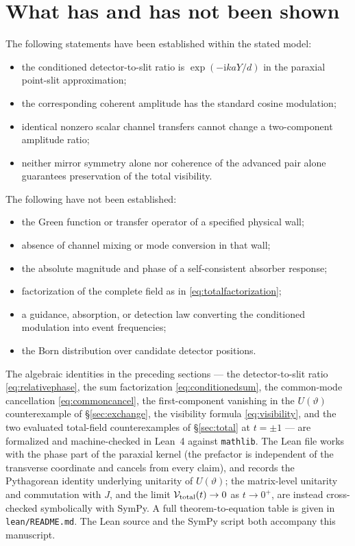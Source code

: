 \documentclass[11pt]{article}
\newcommand{\ii}{\mathrm{i}}
\begin{document}
\section{What has and has not been shown}

The following statements have been established within the stated model:

\begin{itemize}
\item the conditioned detector-to-slit ratio is $\exp(-\ii kaY/d)$ in the paraxial point-slit approximation;
\item the corresponding coherent amplitude has the standard cosine modulation;
\item identical nonzero scalar channel transfers cannot change a two-component amplitude ratio;
\item neither mirror symmetry alone nor coherence of the advanced pair alone guarantees preservation of the total visibility.
\end{itemize}

The following have not been established:

\begin{itemize}
\item the Green function or transfer operator of a specified physical wall;
\item absence of channel mixing or mode conversion in that wall;
\item the absolute magnitude and phase of a self-consistent absorber response;
\item factorization of the complete field as in \eqref{eq:totalfactorization};
\item a guidance, absorption, or detection law converting the conditioned modulation into event frequencies;
\item the Born distribution over candidate detector positions.
\end{itemize}

The algebraic identities in the preceding sections --- the detector-to-slit ratio \eqref{eq:relativephase}, the sum factorization \eqref{eq:conditionedsum}, the common-mode cancellation \eqref{eq:commoncancel}, the first-component vanishing in the $U(\vartheta)$ counterexample of \S\ref{sec:exchange}, the visibility formula \eqref{eq:visibility}, and the two evaluated total-field counterexamples of \S\ref{sec:total} at $t=\pm1$ --- are formalized and machine-checked in Lean~4 against \texttt{mathlib}.  The Lean file works with the phase part of the paraxial kernel (the prefactor is independent of the transverse coordinate and cancels from every claim), and records the Pythagorean identity underlying unitarity of $U(\vartheta)$; the matrix-level unitarity and commutation with $J$, and the limit $\mathcal V_{\rm total}(t)\to0$ as $t\to0^+$, are instead cross-checked symbolically with SymPy.  A full theorem-to-equation table is given in \texttt{lean/README.md}.  The Lean source and the SymPy script both accompany this manuscript.
\end{document}
